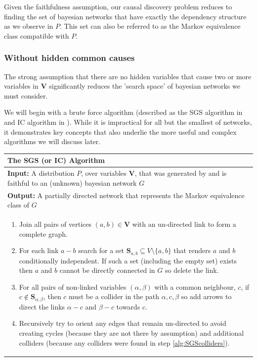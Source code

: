 \documentclass[11pt,a4paper,oneside]{book}
\theoremstyle{plain}
\theoremstyle{definition}
\begin{document}
Given the faithfulness assumption, our causal discovery problem reduces to finding the set of bayesian networks that have exactly the dependency structure as we observe in $P$. This set can also be referred to as the Markov equivalence class compatible with $P$.

\subsubsection{Without hidden common causes}
The strong assumption that there are no hidden variables that cause two or more variables in $\boldsymbol{V}$ significantly reduces the 'search space' of bayesian networks we must consider. 

We will begin with a brute force algorithm (described as the SGS algorithm in \cite{Sprites} and IC algorithm in \cite{Pearl2000}). While it is impractical for all but the smallest of networks, it demonstrates key concepts that also underlie the more useful and complex algorithms we will discuss later. 

\begin{table}[H]
 \begin{tabularx}{\textwidth}{X}
 \hline
\rule{0pt}{2.5ex} 
 \textbf{The SGS (or IC) Algorithm}\\
 \hline
 \rule{0pt}{2.5ex}
\textbf{Input:} A distribution $P$, over variables $\boldsymbol{V}$, that was generated by and is faithful to an (unknown) bayesian network $G$\\
\textbf{Output:} A partially directed network that represents the Markov equivalence class of $G$\\
 \begin{enumerate}[itemsep=8pt]
  \item Join all pairs of vertices $(a,b) \in \boldsymbol{V}$ with an un-directed link to form a complete graph.
  \item For each link $a-b$ search for a set $\boldsymbol{S}_{a,b} \subseteq V \setminus \{a,b\}$ that renders $a$ and $b$ conditionally independent. If such a set (including the empty set) exists then $a$ and $b$ cannot be directly connected in $G$ so delete the link.
  \label{alg:SGSexponential}
  
  \item For all pairs of non-linked variables $(\alpha,\beta)$ with a common neighbour, $c$, if $c \notin \boldsymbol{S}_{\alpha,\beta}$, then $c$ must be a collider in the path $\alpha,c,\beta$ so  add arrows to direct the links $\alpha-c$ and $\beta-c$ towards $c$.
  \label{alg:SGScolliders}  
  \item Recursively try to orient any edges that remain un-directed to avoid creating cycles (because they are not there by assumption) and additional colliders (because any colliders were found in step \ref{alg:SGScolliders}).
  \label{alg:SGSfinal}
\end{enumerate}\\
 \hline
\end{tabularx}
\end{table}
\end{document}

